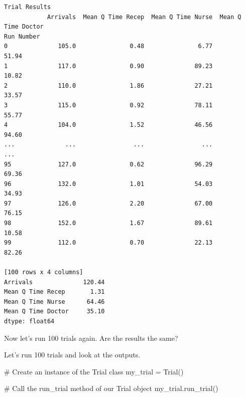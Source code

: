 \documentclass[
  letterpaper,
  DIV=11,
  numbers=noendperiod]{scrreprt}
\newenvironment{Shaded}{\begin{snugshade}}{\end{snugshade}}
\newcommand{\CommentTok}[1]{\textcolor[rgb]{0.37,0.37,0.37}{#1}}
\newcommand{\NormalTok}[1]{\textcolor[rgb]{0.00,0.23,0.31}{#1}}
\newcommand{\OperatorTok}[1]{\textcolor[rgb]{0.37,0.37,0.37}{#1}}
\begin{document}
\begin{verbatim}
Trial Results
            Arrivals  Mean Q Time Recep  Mean Q Time Nurse  Mean Q Time Doctor
Run Number                                                                    
0              105.0               0.48               6.77               51.94
1              117.0               0.90              89.23               10.82
2              110.0               1.86              27.21               33.57
3              115.0               0.92              78.11               55.77
4              104.0               1.52              46.56               94.60
...              ...                ...                ...                 ...
95             127.0               0.62              96.29               69.36
96             132.0               1.01              54.03               34.93
97             126.0               2.20              67.00               76.15
98             152.0               1.67              89.61               10.58
99             112.0               0.70              22.13               82.26

[100 rows x 4 columns]
Arrivals              120.44
Mean Q Time Recep       1.31
Mean Q Time Nurse      64.46
Mean Q Time Doctor     35.10
dtype: float64
\end{verbatim}

Now let's run 100 trials again. Are the results the same?

Let's run 100 trials and look at the outputs.

\begin{Shaded}
\begin{Highlighting}[]
\CommentTok{\# Create an instance of the Trial class}
\NormalTok{my\_trial }\OperatorTok{=}\NormalTok{ Trial()}

\CommentTok{\# Call the run\_trial method of our Trial object}
\NormalTok{my\_trial.run\_trial()}
\end{Highlighting}
\end{Shaded}
\end{document}

